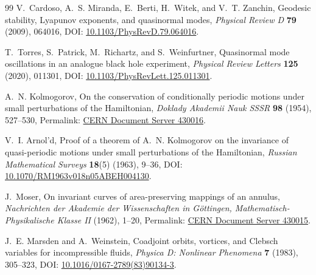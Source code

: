 \documentclass[11pt]{article}
\theoremstyle{definition}
\theoremstyle{plain}
\theoremstyle{remark}
\begin{document}
\begin{thebibliography}{99}
            V.~Cardoso, A.~S. Miranda, E.~Berti, H.~Witek, and V.~T. Zanchin,
            \newblock Geodesic stability, Lyapunov exponents, and quasinormal modes,
            \newblock \emph{Physical Review D} \textbf{79} (2009), 064016,
            \newblock DOI: \href{https://doi.org/10.1103/PhysRevD.79.064016}{10.1103/PhysRevD.79.064016}.

            T.~Torres, S.~Patrick, M.~Richartz, and S.~Weinfurtner,
            \newblock Quasinormal mode oscillations in an analogue black hole experiment,
            \newblock \emph{Physical Review Letters} \textbf{125} (2020), 011301,
            \newblock DOI: \href{https://doi.org/10.1103/PhysRevLett.125.011301}{10.1103/PhysRevLett.125.011301}.


            A.~N. Kolmogorov,
            \newblock On the conservation of conditionally periodic motions under small perturbations of the Hamiltonian,
            \newblock \emph{Doklady Akademii Nauk SSSR} \textbf{98} (1954), 527--530,
            \newblock Permalink: \href{https://cds.cern.ch/record/430016}{CERN Document Server 430016}.

            V.~I. Arnol'd,
            \newblock Proof of a theorem of A.~N. Kolmogorov on the invariance of quasi-periodic motions under small perturbations of the Hamiltonian,
            \newblock \emph{Russian Mathematical Surveys} \textbf{18}(5) (1963), 9--36,
            \newblock DOI: \href{https://doi.org/10.1070/RM1963v018n05ABEH004130}{10.1070/RM1963v018n05ABEH004130}.

            J.~Moser,
            \newblock On invariant curves of area-preserving mappings of an annulus,
            \newblock \emph{Nachrichten der Akademie der Wissenschaften in G\"ottingen, Mathematisch-Physikalische Klasse II} (1962), 1--20,
            \newblock Permalink: \href{https://cds.cern.ch/record/430015}{CERN Document Server 430015}.

            J.~E. Marsden and A.~Weinstein,
            \newblock Coadjoint orbits, vortices, and Clebsch variables for incompressible fluids,
            \newblock \emph{Physica D: Nonlinear Phenomena} \textbf{7} (1983), 305--323,
            \newblock DOI: \href{https://doi.org/10.1016/0167-2789(83)90134-3}{10.1016/0167-2789(83)90134-3}.


\end{thebibliography}
\end{document}
